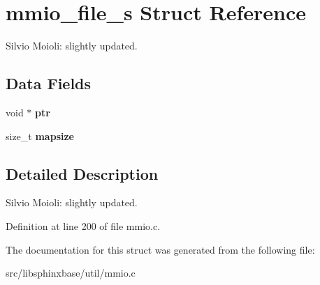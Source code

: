 \section{mmio\-\_\-file\-\_\-s \-Struct \-Reference}
\label{structmmio__file__s}


\-Silvio \-Moioli\-: slightly updated.  


\subsection*{\-Data \-Fields}
\begin{DoxyCompactItemize}
\item 
void $\ast$ {\bfseries ptr}\label{structmmio__file__s_ae1fe8bd596a0906965970108fa849b04}

\item 
size\-\_\-t {\bfseries mapsize}\label{structmmio__file__s_ab2357ad8c44382d8ccd679801692a718}

\end{DoxyCompactItemize}


\subsection{\-Detailed \-Description}
\-Silvio \-Moioli\-: slightly updated. 

\-Definition at line 200 of file mmio.\-c.



\-The documentation for this struct was generated from the following file\-:\begin{DoxyCompactItemize}
\item 
src/libsphinxbase/util/mmio.\-c\end{DoxyCompactItemize}
